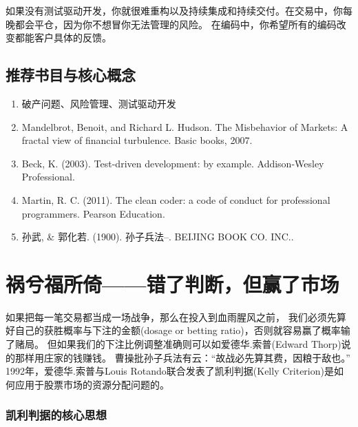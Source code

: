 \documentclass[
  oneside]{book}
\providecommand{\tightlist}{%
  \setlength{\itemsep}{0pt}\setlength{\parskip}{0pt}}
\begin{document}
如果没有测试驱动开发，你就很难重构以及持续集成和持续交付。在交易中，你每晚都会平仓，因为你不想冒你无法管理的风险。
在编码中，你希望所有的编码改变都能客户具体的反馈。

\hypertarget{ux63a8ux8350ux4e66ux76eeux4e0eux6838ux5fc3ux6982ux5ff5}{%
\section{推荐书目与核心概念}\label{ux63a8ux8350ux4e66ux76eeux4e0eux6838ux5fc3ux6982ux5ff5}}

\begin{enumerate}
\def\labelenumi{\arabic{enumi}.}
\tightlist
\item
  破产问题、风险管理、测试驱动开发
\item
  Mandelbrot, Benoit, and Richard L. Hudson. The Misbehavior of Markets: A fractal view of financial turbulence. Basic books, 2007.
\item
  Beck, K. (2003). Test-driven development: by example. Addison-Wesley Professional.
\item
  Martin, R. C. (2011). The clean coder: a code of conduct for professional programmers. Pearson Education.
\item
  孙武, \& 郭化若. (1900). 孙子兵法--. BEIJING BOOK CO. INC..
\end{enumerate}

\hypertarget{ux7978ux516eux798fux6240ux501aux9519ux4e86ux5224ux65adux4f46ux8d62ux4e86ux5e02ux573a}{%
\chapter{祸兮福所倚------错了判断，但赢了市场}\label{ux7978ux516eux798fux6240ux501aux9519ux4e86ux5224ux65adux4f46ux8d62ux4e86ux5e02ux573a}}

如果把每一笔交易都当成一场战争，那么在投入到血雨腥风之前，
我们必须先算好自己的获胜概率与下注的金额(dosage or betting ratio)，否则就容易赢了概率输了赌局。
但如果我们的下注比例调整准确则可以如爱德华.索普(Edward Thorp)说的那样用庄家的钱赚钱。
曹操批孙子兵法有云：``故战必先算其费，因粮于敌也。''
1992年，爱德华.索普与Louis Rotando联合发表了凯利判据(Kelly Criterion)是如何应用于股票市场的资源分配问题的。

\hypertarget{ux51efux5229ux5224ux636eux7684ux6838ux5fc3ux601dux60f3}{%
\subsection{凯利判据的核心思想}\label{ux51efux5229ux5224ux636eux7684ux6838ux5fc3ux601dux60f3}}
\end{document}
